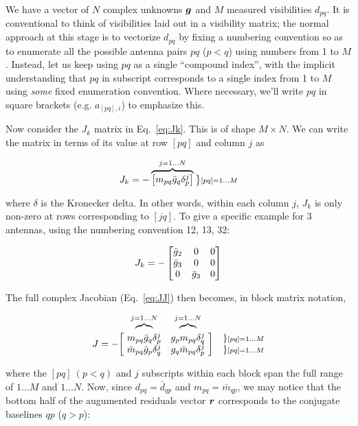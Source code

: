 \documentclass[useAMS,usenatbib]{mn2e}
\newcommand{\JJ}{J} %
\begin{document}
We have a vector of $N$ complex unknowns $\bmath{g}$ and $M$ measured visibilities $d_{pq}$. It is conventional
to think of visibilities laid out in a visibility matrix; the normal approach at this stage is to vectorize $d_{pq}$ 
by fixing a numbering convention so as to enumerate all the possible antenna pairs $pq$ ($p<q$) using numbers from 1 to $M$.
Instead, let us keep using $pq$ as a single ``compound index'', with the implicit understanding that $pq$ in 
subscript corresponds to a single index from 1 to $M$ using \emph{some} fixed enumeration convention. 
Where necessary, we'll write $pq$ in square brackets (e.g. $a_{[pq],i}$) to emphasize this.

Now consider the $J_k$ matrix in Eq.~\ref{eq:Jk}. This is of shape $M\times N$. We can write the
matrix in terms of its value at row $[pq]$ and column $j$ as 

\[
J_k = - \overbrace{ \Matrix{c}{ m_{pq}\bar{g}_q\delta^{j}_p } } ^{j=1\dots N} \big \}{\scriptstyle [pq]=1\dots M}
\]

where $\delta$ is the Kronecker delta. In other words, within each column $j$, $J_k$ is only non-zero at rows 
corresponding to $[jq]$. To give a specific example for 3 antennas, using the numbering convention 
12, 13, 32:

\[
J_k = - \Matrix{ccc}{\bar{g}_2 & 0 & 0 \\ \bar{g}_3 & 0 & 0 \\ 0 & \bar{g}_3 & 0 }
\]


The full complex Jacobian (Eq.~\ref{eq:JJ}) then becomes, in block matrix notation,

\begin{equation}
\label{eq:JJ:di:basic}
\begin{array}{r@{~}cc@{~}cc}
                & \overbrace{}^{j=1\dots N} & \overbrace{}^{j=1\dots N} \\
\JJ = - \bigg [ &
  \Stack{ m_{pq}\bar{g}_q\delta^{j}_p \\ \bar{m}_{pq} \bar{g}_p \delta^{j}_q } &
  \Stack{ g_p m_{pq} \delta^{j}_q \\ g_q \bar{m}_{pq} \delta^{j}_p }  
& \bigg ] &
\Stack{ \} {\scriptstyle [pq]=1\dots M} \\ \} {\scriptstyle [pq]=1\dots M} }

\end{array}
\end{equation}

where the $[pq]~(p<q)$ and $j$ subscripts within each block span the full range of $1\dots M$ and $1\dots N$. Now, 
since $d_{pq} = \bar{d}_{qp}$ and $m_{pq} = \bar{m}_{qp}$, we may notice
that the bottom half of the augumented residuals vector $\bmath{r}$ corresponds to the conjugate baselines 
$qp$ ($q>p$):
\end{document}
